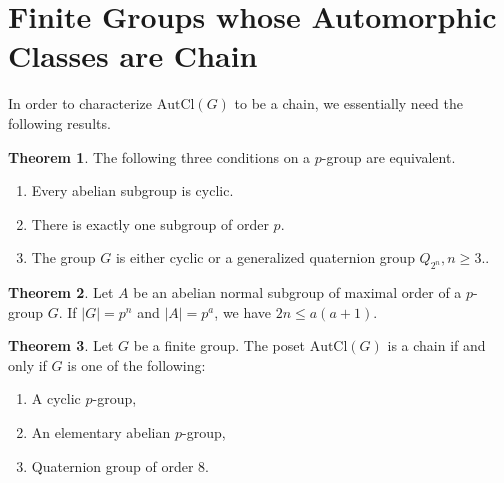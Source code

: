 \documentclass{article}
\theoremstyle{definition}
\newtheorem{theorem}{Theorem}[section]
\begin{document}
\section{Finite Groups whose Automorphic Classes are Chain}
In order to characterize $\text{AutCl}(G)$ to be a chain, we essentially need the following results. 
\begin{theorem} \cite{suzuki1986group} The following three conditions on a $p$-group are equivalent.
\begin{enumerate}
    \item Every abelian subgroup is cyclic.
    \item There is exactly one subgroup of order $ p$.
    \item The group $ G$ is either cyclic or a generalized quaternion group $Q_{2^n}, n\ge3.$.
\end{enumerate} \end{theorem}
\begin{theorem} \cite{suzuki1982group} Let $A$ be an abelian normal subgroup of maximal order of a $p$-group $G$. If $|G| = p^n$ and $|A| = p^a$, we have $2n \le a(a + 1)$. \end{theorem}
\begin{theorem} Let $G$ be a finite group. The poset $\text{AutCl}(G)$ is a chain if and only if $G$ is one of the following: \begin{enumerate}
    \item A cyclic $p$-group,
    \item An elementary abelian $p$-group, 
    \item Quaternion group of order 8.
\end{enumerate} 
\end{theorem}
\end{document}
